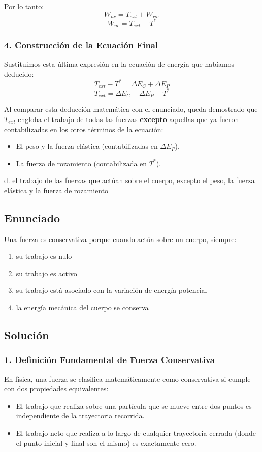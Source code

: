\documentclass[12pt, a4paper]{article}
\begin{document}
Por lo tanto:
$$W_{nc} = T_{ext} + W_{roz}$$
$$W_{nc} = T_{ext} - T^*$$

\subsubsection*{4. Construcción de la Ecuación Final}
Sustituimos esta última expresión en la ecuación de energía que habíamos deducido:
$$T_{ext} - T^* = \Delta E_C + \Delta E_P$$
$$T_{ext} = \Delta E_C + \Delta E_P + T^*$$

Al comparar esta deducción matemática con el enunciado, queda demostrado que $T_{ext}$ engloba el trabajo de todas las fuerzas \textbf{excepto} aquellas que ya fueron contabilizadas en los otros términos de la ecuación:
\begin{itemize}
    \item El peso y la fuerza elástica (contabilizadas en $\Delta E_P$).
    \item La fuerza de rozamiento (contabilizada en $T^*$).
\end{itemize}

\begin{tcolorbox}[colback=green!5!white, colframe=green!50!black, title=Respuesta Correcta]
\centering \Large d. el trabajo de las fuerzas que actúan sobre el cuerpo, excepto el peso, la fuerza elástica y la fuerza de rozamiento
\end{tcolorbox}

\newpage

\subsection*{Enunciado}
Una fuerza es conservativa porque cuando actúa sobre un cuerpo, siempre:
\begin{enumerate}[label=\alph*.]
    \item su trabajo es nulo
    \item su trabajo es activo
    \item su trabajo está asociado con la variación de energía potencial
    \item la energía mecánica del cuerpo se conserva
\end{enumerate}

\subsection*{Solución}

\subsubsection*{1. Definición Fundamental de Fuerza Conservativa}
En física, una fuerza se clasifica matemáticamente como conservativa si cumple con dos propiedades equivalentes:
\begin{itemize}
    \item El trabajo que realiza sobre una partícula que se mueve entre dos puntos es independiente de la trayectoria recorrida.
    \item El trabajo neto que realiza a lo largo de cualquier trayectoria cerrada (donde el punto inicial y final son el mismo) es exactamente cero.
\end{itemize}
\end{document}
